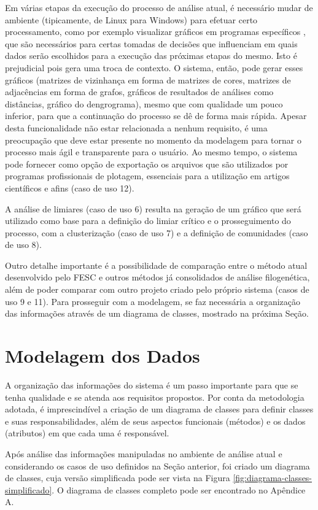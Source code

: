 Em várias etapas da execução do processo de análise atual, é necessário mudar de ambiente (tipicamente, de Linux para Windows) para efetuar certo processamento,
como por exemplo visualizar
gráficos em
programas específicos \cite{origin},
que são necessários para certas tomadas de decisões que influenciam em quais dados serão escolhidos para a execução das próximas etapas do mesmo. Isto é
prejudicial pois gera uma troca de contexto. O sistema, então, pode gerar esses gráficos (matrizes de vizinhança em forma de matrizes de cores, matrizes de
adjacências em forma de grafos, gráficos de resultados de análises como distâncias, gráfico do dengrograma), mesmo que com qualidade um pouco inferior,
para que a continuação do processo se dê de forma mais rápida. Apesar desta funcionalidade não estar relacionada a nenhum requisito, é
uma preocupação que deve estar presente no momento da modelagem para
tornar o processo mais ágil e transparente para o usuário. Ao mesmo tempo, o sistema pode fornecer como opção de exportação os arquivos que são utilizados por
programas profissionais de plotagem, essenciais para a utilização em artigos científicos e afins (caso de uso 12).

A análise de limiares (caso de uso 6) resulta na geração de um gráfico que será utilizado como base para a definição do limiar crítico e o prosseguimento
do processo, com a clusterização (caso de uso 7) e a definição de comunidades (caso de uso 8).

Outro detalhe importante é a possibilidade de comparação entre o método atual desenvolvido pelo FESC
e outros métodos já consolidados de análise filogenética,
além de poder comparar com outro projeto criado pelo próprio sistema (casos de uso 9 e 11).
Para prosseguir com a modelagem, se faz necessária a organização das informações através
de um diagrama de classes, mostrado na próxima Seção.

\section{Modelagem dos Dados} \label{sec:organizacao}

A organização das informações do sistema é um passo importante para que se tenha qualidade e se atenda aos requisitos propostos. Por conta da metodologia
adotada, é imprescindível a criação de um diagrama de classes para definir classes e suas responsabilidades, além de seus aspectos funcionais (métodos)
e os dados
(atributos) em que cada uma é responsável.

Após análise das informações manipuladas no ambiente de análise atual e considerando os casos de uso definidos na Seção anterior,
foi criado um diagrama de classes, cuja versão simplificada pode ser vista na Figura
\ref{fig:diagrama-classes-simplificado}. O diagrama de classes completo pode ser encontrado no Apêndice A.

